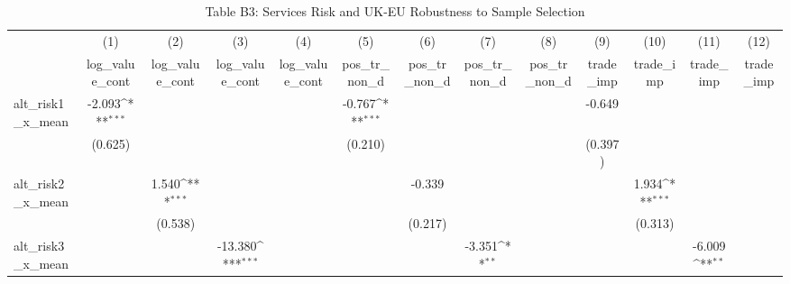 \begin{table}[htbp]\centering
\def\sym#1{\ifmmode^{#1}\else\(^{#1}\)\fi}
\caption{Table B3: Services Risk and UK-EU Robustness to Sample Selection}
\begin{tabular}{l*{12}{c}}
\hline\hline
            &\multicolumn{1}{c}{(1)}&\multicolumn{1}{c}{(2)}&\multicolumn{1}{c}{(3)}&\multicolumn{1}{c}{(4)}&\multicolumn{1}{c}{(5)}&\multicolumn{1}{c}{(6)}&\multicolumn{1}{c}{(7)}&\multicolumn{1}{c}{(8)}&\multicolumn{1}{c}{(9)}&\multicolumn{1}{c}{(10)}&\multicolumn{1}{c}{(11)}&\multicolumn{1}{c}{(12)}\\
            &\multicolumn{1}{c}{log\_value\_cont}&\multicolumn{1}{c}{log\_value\_cont}&\multicolumn{1}{c}{log\_value\_cont}&\multicolumn{1}{c}{log\_value\_cont}&\multicolumn{1}{c}{pos\_tr\_non\_d}&\multicolumn{1}{c}{pos\_tr\_non\_d}&\multicolumn{1}{c}{pos\_tr\_non\_d}&\multicolumn{1}{c}{pos\_tr\_non\_d}&\multicolumn{1}{c}{trade\_imp}&\multicolumn{1}{c}{trade\_imp}&\multicolumn{1}{c}{trade\_imp}&\multicolumn{1}{c}{trade\_imp}\\
\hline
alt\_risk1\_x\_mean&      -2.093\sym{***}&                     &                     &                     &      -0.767\sym{***}&                     &                     &                     &      -0.649         &                     &                     &                     \\
            &     (0.625)         &                     &                     &                     &     (0.210)         &                     &                     &                     &     (0.397)         &                     &                     &                     \\
[1em]
alt\_risk2\_x\_mean&                     &       1.540\sym{***}&                     &                     &                     &      -0.339         &                     &                     &                     &       1.934\sym{***}&                     &                     \\
            &                     &     (0.538)         &                     &                     &                     &     (0.217)         &                     &                     &                     &     (0.313)         &                     &                     \\
[1em]
alt\_risk3\_x\_mean&                     &                     &     -13.380\sym{***}&                     &                     &                     &      -3.351\sym{**} &                     &                     &                     &      -6.009\sym{**} &                     \\

\end{tabular}
\end{table}
